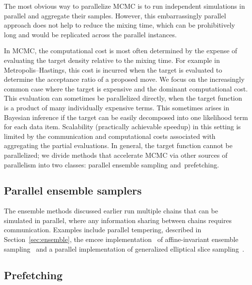 \documentclass[angelino.tex]{subfiles}
\begin{document}
The most obvious way to parallelize MCMC is to run independent simulations in
parallel and aggregate their samples.
However, this embarrassingly parallel approach does not help to reduce the
mixing time, which can be prohibitively long and would be replicated across
the parallel instances.

In MCMC, the computational cost is most often determined by the expense of
evaluating the target density relative to the mixing time.
For example in Metropolis--Hastings, this cost is incurred when the target is 
evaluated to determine the acceptance ratio of a proposed move.
We focus on the increasingly common case where the target is expensive and the 
dominant computational cost.
This evaluation can sometimes be parallelized directly,
\eg when the target function is a product of many individually expensive terms.
This sometimes arises in Bayesian inference if the target can be easily
decomposed into one likelihood term for each data item.
Scalability (\ie practically achievable speedup) in this setting is limited by
the communication and computational costs associated with aggregating
the partial evaluations.
In general, the target function cannot be parallelized;
we divide methods that accelerate MCMC via other sources of parallelism into
two classes: parallel ensemble sampling and~prefetching.

\subsection{Parallel ensemble samplers}

The ensemble methods discussed earlier run multiple chains that can be simulated
in parallel, where any information sharing between chains requires communication.
Examples include parallel tempering, described in Section~\ref{sec:ensemble},
the emcee implementation~\citep{goodman-2012-emcee}
of affine-invariant ensemble sampling~\citep{goodman-2010-ensemble}
and a parallel implementation of
generalized elliptical slice sampling~\citep{nishihara-2014-gess}.

\subsection{Prefetching}
\label{sec:mcmc-prefetching}
\end{document}
